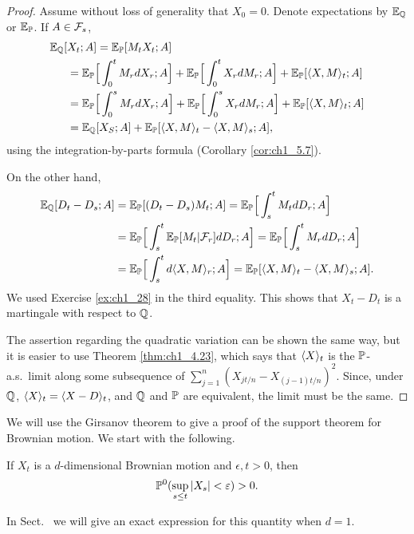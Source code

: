 \begin{proof}
Assume without loss of generality that $X_0 = 0$. Denote expectations by $\E_\Q$ or $\E_\P$. If $A \in \FC_s$,
\begin{align*}
    \E_\Q[& X_t; A] = \E_\P[M_tX_t; A] \\
    &= \E_\P\Big[\int_0^t M_r dX_r; A\Big] + \E_\P\Big[\int_0^t X_r dM_r; A\Big] + \E_\P[\lrang{X,M}_t; A] \\
    &= \E_\P\Big[\int_0^s M_r dX_r; A\Big] + \E_\P\Big[\int_0^s X_r dM_r; A\Big] + \E_\P[\lrang{X,M}_t; A] \\
    & = \E_\Q[X_S;A] + \E_\P[\lrang{X,M}_t - \lrang{X,M}_s; A],
\end{align*}
\mnewpage
using the integration-by-parts formula (Corollary \ref{cor:ch1_5.7}).

On the other hand,
\begin{align*}
    \E_\Q[D_t-D_s;A]&= \E_\P[(D_t-D_s)M_t;A]=\E_\P\Big[\int_s^t M_tdD_r;A\Big] \\
    &=\E_\P\Big[\int_s^t \E_\P[M_t\mid \FC_r]dD_r;A\Big]=\E_\P\Big[\int_s^t M_rdD_r;A\Big] \\
    &=\E_\P\Big[\int_s^t d\lrang{X,M}_r;A\Big]=\E_\P[\lrang{X,M}_t-\lrang{X,M}_s;A].
\end{align*}
We used Exercise \ref{ex:ch1_28} in the third equality. This shows that $X_t - D_t$ is a martingale with respect to $\Q$.

The assertion regarding the quadratic variation can be shown the same way, but it is easier to use Theorem \ref{thm:ch1_4.23}, which says that $\lrang{X}_t$ is the $\P$-a.s.\ limit along some subsequence of $\sum_{j=1}^n(X_{jt/n} - X_{(j-1)t/n})^2$. Since, under $\Q$, $\lrang{X}_t = \lrang{X - D}_t$, and $\Q$ and $\P$ are equivalent, the limit must be the same.
\end{proof}


We will use the Girsanov theorem to give a proof of the support theorem for Brownian motion. We start with the following.

\begin{proposition}\label{prop:ch1_6.5}
If $X_t$ is a $d$-dimensional Brownian motion and $\epsilon,t > 0$, then
\[
    \P^0(\sup_{s\leq t} |X_s| < \epsilon) > 0.
\]
\end{proposition}

In Sect.\  we will give an exact expression for this quantity when $d = 1$.

